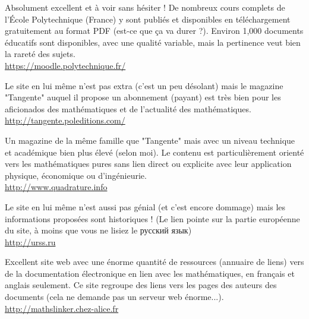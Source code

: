 	{\Large {}}{\Large {}}{\Large {}}{\Large {}}\bcdfrance{} Absolument excellent et à voir sans hésiter ! De nombreux cours complets de l'École Polytechnique (France) y sont publiés et disponibles en téléchargement gratuitement au format PDF (est-ce que ça va durer ?). Environ 1,000 documents éducatifs sont disponibles, avec une qualité variable, mais la pertinence veut bien la rareté des sujets.\\
	\href{https://moodle.polytechnique.fr/}{\color{blue} https://moodle.polytechnique.fr/}
	
	{\Large {}}{\Large {}}{\Large {}}{\Large {}}\bcdfrance{}  Le site en lui même n'est pas extra (c'est un peu désolant) mais le magazine "Tangente" auquel il propose un abonnement (payant) est très bien pour les aficionados des mathématiques et de l'actualité des mathématiques.\\
	\href{http://tangente.poleditions.com/}{\color{blue}http://tangente.poleditions.com/}
	
	{\Large {}}{\Large {}}{\Large {}}{\Large {}}\bcdfrance{} Un magazine de la même famille que "Tangente" mais avec un niveau technique et académique bien plus élevé (selon moi). Le contenu est particulièrement orienté vers les mathématiques pures sans lien direct ou explicite avec leur application physique, économique ou d'ingénieurie.\\
	\href{http://www.quadrature.info}{\color{blue}http://www.quadrature.info}
	
	{\Large {}}{\Large {}}{\Large {}}{\Large {}} Le site en lui même n'est aussi pas génial (et c'est encore dommage) mais les informations proposées sont historiques ! (Le lien pointe sur la partie européenne du site, à moins que vous ne lisiez le русский язык)\\
	\href{http://urss.ru/cgi-bin/db.pl?lang=en&blang=en&page=Catalog&list=1}{\color{blue}http://urss.ru}
	
	{\Large {}}{\Large {}}{\Large {}}{\Large {}}\bcdfrance{} Excellent site web avec une énorme quantité de ressources (annuaire de liens) vers de la documentation électronique en lien avec les mathématiques, en français et anglais seulement. Ce site regroupe des liens vers les pages des auteurs des documents (cela ne demande pas un serveur web énorme...).\\
	\href{http://mathslinker.chez-alice.fr}{\color{blue}http://mathslinker.chez-alice.fr}
	
